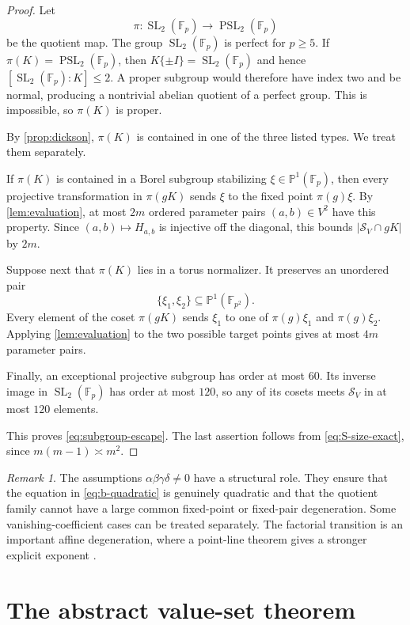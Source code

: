 \documentclass[11pt,reqno]{amsart}
\numberwithin{equation}{section}
\theoremstyle{definition}
\theoremstyle{remark}
\newtheorem{remark}[remark]{Remark}
\newcommand{\F}{\mathbb F}
\newcommand{\Pone}{\mathbb P^1}
\newcommand{\SL}{\operatorname{SL}}
\newcommand{\PSL}{\operatorname{PSL}}
\newcommand{\cS}{\mathcal S}
\begin{document}
\begin{proof}
Let
\[
  \pi:\SL_2(\F_p)\longrightarrow\PSL_2(\F_p)
\]
be the quotient map.  The group $\SL_2(\F_p)$ is perfect for $p\ge5$.  If $\pi(K)=\PSL_2(\F_p)$, then $K\{\pm I\}=\SL_2(\F_p)$ and hence $[\SL_2(\F_p):K]\le2$.  A proper subgroup would therefore have index two and be normal, producing a nontrivial abelian quotient of a perfect group.  This is impossible, so $\pi(K)$ is proper.

By \cref{prop:dickson}, $\pi(K)$ is contained in one of the three listed types.  We treat them separately.

If $\pi(K)$ is contained in a Borel subgroup stabilizing $\xi\in\Pone(\F_p)$, then every projective transformation in $\pi(gK)$ sends $\xi$ to the fixed point $\pi(g)\xi$.  By \cref{lem:evaluation}, at most $2m$ ordered parameter pairs $(a,b)\in V^2$ have this property.  Since $(a,b)\mapsto H_{a,b}$ is injective off the diagonal, this bounds $|\cS_V\cap gK|$ by $2m$.

Suppose next that $\pi(K)$ lies in a torus normalizer.  It preserves an unordered pair
\[
  \{\xi_1,\xi_2\}\subseteq\Pone(\F_{p^2}).
\]
Every element of the coset $\pi(gK)$ sends $\xi_1$ to one of $\pi(g)\xi_1$ and $\pi(g)\xi_2$.  Applying \cref{lem:evaluation} to the two possible target points gives at most $4m$ parameter pairs.

Finally, an exceptional projective subgroup has order at most $60$.  Its inverse image in $\SL_2(\F_p)$ has order at most $120$, so any of its cosets meets $\cS_V$ in at most $120$ elements.

This proves \eqref{eq:subgroup-escape}.  The last assertion follows from \eqref{eq:S-size-exact}, since $m(m-1)\asymp m^2$.
\end{proof}

\begin{remark}\label{rem:nonzero-coefficients}
The assumptions $\alpha\beta\gamma\delta\ne0$ have a structural role.  They ensure that the equation in \eqref{eq:b-quadratic} is genuinely quadratic and that the quotient family cannot have a large common fixed-point or fixed-pair degeneration.  Some vanishing-coefficient cases can be treated separately.  The factorial transition is an important affine degeneration, where a point-line theorem gives a stronger explicit exponent \cite{HuFactorials2026}.
\end{remark}

\section{The abstract value-set theorem}\label{sec:abstract-proof}
\end{document}
